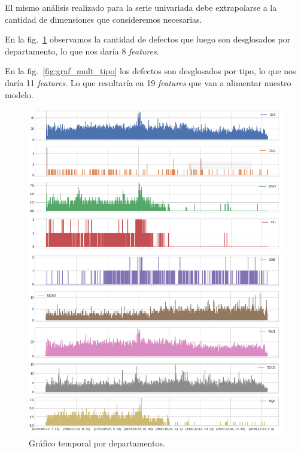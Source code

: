 \documentclass[a4paper,12pt]{article}
\begin{document}
		El mismo análisis realizado para la serie univariada debe extrapolarse a la cantidad de dimensiones que consideremos necesarias. 
				
		En la fig.~\ref{fig:graf_mult_dpto} observamos la cantidad de defectos que luego son desglosados por departamento, lo que nos daría 8 \textit{features}. 
		
		En la fig.~\ref{fig:graf_mult_tipo} los defectos son desglosados por tipo, lo que nos daría 11 \textit{features}. Lo que resultaría en 19 \textit{features} que van a alimentar nuestro modelo.
				
		\begin{figure}[H]
			\begin{center}
				\includegraphics[width=1\textwidth]{multi_dpto.png}
				\caption{Gráfico temporal por departamentos.}
				\label{fig:graf_mult_dpto}
			\end{center}
		\end{figure}
				
\end{document}
